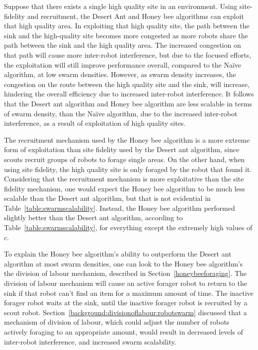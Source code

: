 Suppose that there exists a single high quality site in an environment. Using site-fidelity and recruitment, the Desert Ant and Honey bee algorithms can exploit that high quality area. In exploiting that high quality site, the path between the sink and the high-quality site becomes more congested as more robots share the path between the sink and the high quality area. The increased congestion on that path will cause more inter-robot interference, but due to the focused efforts, the exploitation will still improve performance overall, compared to the Na\"ive algorithm, at low swarm densities. However, as swarm density increases, the congestion on the route between the high quality site and the sink, will increase, hindering the overall efficiency due to increased inter-robot interference. It follows that the Desert ant algorithm and Honey bee algorithm are less scalable in terms of swarm density, than the Na\"ive algorithm, due to the increased inter-robot interference, as a result of exploitation of high quality sites.

The recruitment mechanism used by the Honey bee algorithm is a more extreme form of exploitation than site fidelity used by the Desert ant algorithm, since scouts recruit groups of robots to forage single areas. On the other hand, when using site fidelity, the high quality site is only foraged by the robot that found it. Considering that the recruitment mechanism is more exploitative than the site fidelity mechanism, one would expect the Honey bee algorithm to be much less scalable than the Desert ant algorithm, but that is not evidential in Table~\ref{table:swarmscalability}. Instead, the Honey bee algorithm performed slightly better than the Desert ant algorithm, according to Table~\ref{table:swarmscalability}, for everything except the extremely high values of $c$. 

To explain the Honey bee algorithm's ability to outperform the Desert ant algorithm at most swarm densities, one can look to the Honey bee algorithm's the division of labour mechanism, described in Section~\ref{honeybeeforaging}. The division of labour mechanism will cause an active forager robot to return to the sink if that robot can't find an item for a maximum amount of time. The inactive forager robot waits at the sink, until the inactive forager robot is recruited by a scout robot. Section~\ref{background:divisionoflabour:robotswarm} discussed that a mechanism of division of labour, which could adjust the number of robots actively foraging to an appropriate amount, would result in decreased levels of inter-robot interference, and increased swarm scalability.


